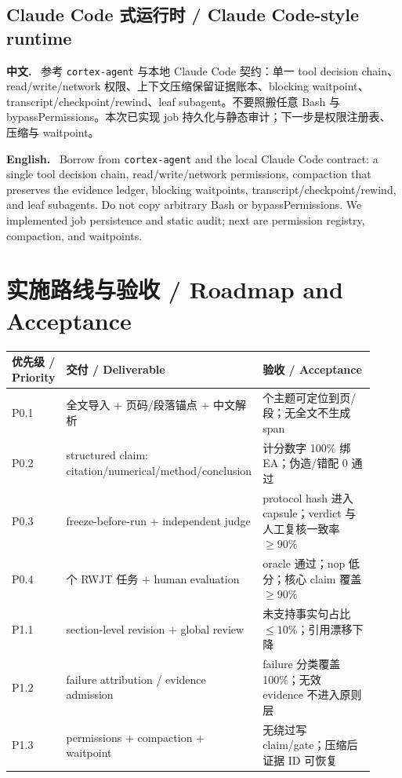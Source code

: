 \documentclass[UTF8,11pt]{ctexart}
\newcommand{\zh}{\par\noindent\textbf{中文.}\ }
\newcommand{\en}{\par\noindent\textbf{English.}\ }
\begin{document}
\subsection{Claude Code 式运行时 / Claude Code-style runtime}
\zh
参考 \texttt{cortex-agent} 与本地 Claude Code 契约：单一 tool decision chain、read/write/network 权限、上下文压缩保留证据账本、blocking waitpoint、transcript/checkpoint/rewind、leaf subagent。不要照搬任意 Bash 与 bypassPermissions。本次已实现 job 持久化与静态审计；下一步是权限注册表、压缩与 waitpoint。
\en
Borrow from \texttt{cortex-agent} and the local Claude Code contract: a single tool decision chain, read/write/network permissions, compaction that preserves the evidence ledger, blocking waitpoints, transcript/checkpoint/rewind, and leaf subagents. Do not copy arbitrary Bash or bypassPermissions. We implemented job persistence and static audit; next are permission registry, compaction, and waitpoints.

\section{实施路线与验收 / Roadmap and Acceptance}

\begin{longtable}{>{\raggedright\arraybackslash}p{0.12\linewidth} >{\raggedright\arraybackslash}p{0.40\linewidth} >{\raggedright\arraybackslash}p{0.40\linewidth}}
\toprule
优先级 / Priority & 交付 / Deliverable & 验收 / Acceptance\\
\midrule
\endhead
P0.1 & 全文导入 + 页码/段落锚点 + 中文解析 & 20 个主题可定位到页/段；无全文不生成 span\\
P0.2 & structured claim: citation/numerical/method/conclusion & 计分数字 100\% 绑 EA；伪造/错配 0 通过\\
P0.3 & freeze-before-run + independent judge & protocol hash 进入 capsule；verdict 与人工复核一致率 \(\ge 90\%\)\\
P0.4 & 4 个 RWJT 任务 + human evaluation & oracle 通过；nop 低分；核心 claim 覆盖 \(\ge 90\%\)\\
P1.1 & section-level revision + global review & 未支持事实句占比 \(\le 10\%\)；引用漂移下降\\
P1.2 & failure attribution / evidence admission & failure 分类覆盖 100\%；无效 evidence 不进入原则层\\
P1.3 & permissions + compaction + waitpoint & 无绕过写 claim/gate；压缩后证据 ID 可恢复\\
\bottomrule
\end{longtable}
\end{document}
